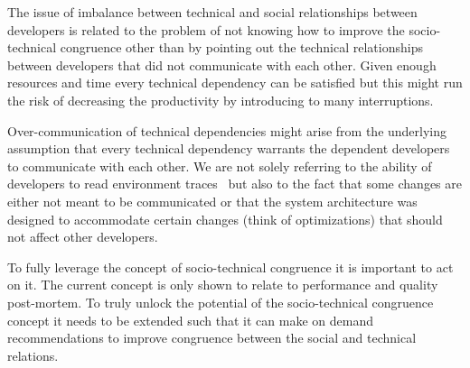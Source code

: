 The issue of imbalance between technical and social relationships between developers is related to the problem of not knowing how to improve the socio-technical congruence other than by pointing out the technical relationships between developers that did not communicate with each other.
Given enough resources and time every technical dependency can be satisfied but this might run the risk of decreasing the productivity by introducing to many interruptions.

Over-communication of technical dependencies might arise from the underlying assumption that every technical dependency warrants the dependent developers to communicate with each other.
We are not solely referring to the ability of  developers to read environment traces~\cite{bolici:stc:2009} but also to the fact that some changes are either not meant to be communicated or that the system architecture was designed to accommodate certain changes (think of optimizations) that should not affect other developers.

To fully leverage the concept of socio-technical congruence it is important to act on it.
The current concept is only shown to relate to performance and quality post-mortem.
To truly unlock the potential of the socio-technical congruence concept it needs to be extended such that it can make on demand recommendations to improve congruence between the social and technical relations.

